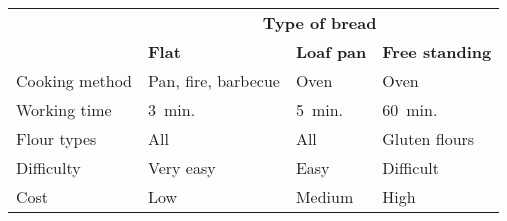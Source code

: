 \begin{tabular}{@{}llll@{}}
\toprule
                    &             \multicolumn{3}{c}{\textbf{Type of bread}}\\
                                  \cmidrule(lll){2-4}
                    & \textbf{Flat}       & \textbf{Loaf pan} &  \textbf{Free standing} \\ \midrule
Cooking method      & Pan, fire, barbecue & Oven              & Oven                    \\ 
Working time        & 3~min.              & 5~min.            & 60~min.                 \\ 
Flour types         & All                 & All               & Gluten flours           \\ 
Difficulty          & Very easy           & Easy              & Difficult               \\ 
Cost                & Low                 & Medium            & High                    \\ \bottomrule
\end{tabular}
